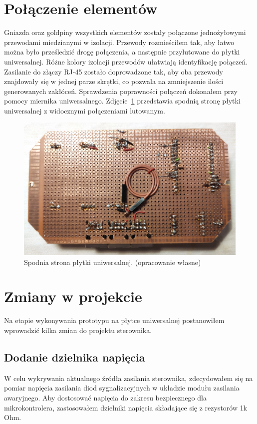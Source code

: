 \documentclass[11pt]{report}
\begin{document}
 \section{Połączenie elementów}
 Gniazda oraz goldpiny wszystkich elementów zostały połączone jednożyłowymi przewodami miedzianymi w izolacji. Przewody rozmieściłem tak, aby łatwo można było prześledzić drogę połączenia, a następnie przylutowane do płytki uniwersalnej. Różne kolory izolacji przewodów ułatwiają identyfikację połączeń. Zasilanie do złączy RJ-45 zostało doprowadzone tak, aby oba przewody znajdowały się w jednej parze skrętki, co pozwala na zmniejszenie ilości generowanych zakłóceń.
 Sprawdzenia poprawności połączeń dokonałem przy pomocy miernika uniwersalnego.
   Zdjęcie~\ref{fig:uni_dol} przedstawia spodnią stronę płytki uniwersalnej z widocznymi połączeniami lutowanym.
\begin{figure}[ht]
\centering
\includegraphics[width=0.8 \textwidth]{fig/plytka_dol.jpg}
\caption{Spodnia strona płytki uniwersalnej. (opracowanie własne)}
\label{fig:uni_dol}
\end{figure}

 \section{Zmiany w projekcie}
 Na etapie wykonywania prototypu na płytce uniwersalnej postanowiłem wprowadzić kilka zmian do projektu sterownika.
 \subsection{Dodanie dzielnika napięcia}
 W celu wykrywania aktualnego źródła zasilania sterownika, zdecydowałem się na pomiar napięcia zasilania diod sygnalizacyjnych w układzie modułu zasilania awaryjnego. Aby dostosować napięcia do zakresu bezpiecznego dla mikrokontrolera, zastosowałem dzielniki napięcia składające się z rezystorów 1k Ohm.
\end{document}
